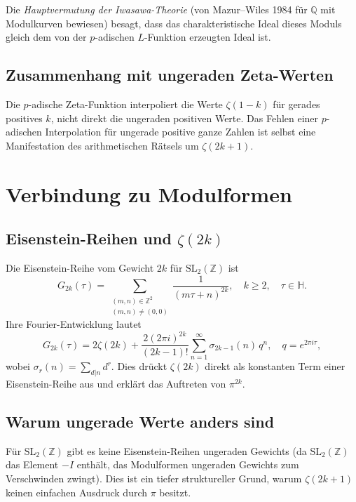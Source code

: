 \documentclass[12pt,a4paper]{amsart}
\theoremstyle{definition}
\theoremstyle{remark}
\begin{document}
Die \emph{Hauptvermutung der Iwasawa-Theorie} (von Mazur--Wiles 1984 für $\mathbb{Q}$
mit Modulkurven bewiesen) besagt, dass das charakteristische Ideal dieses Moduls
gleich dem von der $p$-adischen $L$-Funktion erzeugten Ideal ist.

\subsection{Zusammenhang mit ungeraden Zeta-Werten}

Die $p$-adische Zeta-Funktion interpoliert die Werte $\zeta(1-k)$ für gerades
positives $k$, nicht direkt die ungeraden positiven Werte. Das Fehlen einer
$p$-adischen Interpolation für ungerade positive ganze Zahlen ist selbst eine
Manifestation des arithmetischen Rätsels um $\zeta(2k+1)$.

\section{Verbindung zu Modulformen}

\subsection{Eisenstein-Reihen und $\zeta(2k)$}

Die Eisenstein-Reihe vom Gewicht $2k$ für $\mathrm{SL}_2(\mathbb{Z})$ ist
\[
  G_{2k}(\tau) = \sum_{\substack{(m,n) \in \mathbb{Z}^2 \\ (m,n) \neq (0,0)}}
  \frac{1}{(m\tau + n)^{2k}}, \quad k \geq 2, \quad \tau \in \mathbb{H}.
\]
Ihre Fourier-Entwicklung lautet
\[
  G_{2k}(\tau) = 2\zeta(2k) + \frac{2(2\pi i)^{2k}}{(2k-1)!}
  \sum_{n=1}^{\infty} \sigma_{2k-1}(n)\, q^n, \quad q = e^{2\pi i \tau},
\]
wobei $\sigma_r(n) = \sum_{d|n} d^r$. Dies drückt $\zeta(2k)$ direkt als
konstanten Term einer Eisenstein-Reihe aus und erklärt das Auftreten von $\pi^{2k}$.

\subsection{Warum ungerade Werte anders sind}

Für $\mathrm{SL}_2(\mathbb{Z})$ gibt es keine Eisenstein-Reihen ungeraden
Gewichts (da $\mathrm{SL}_2(\mathbb{Z})$ das Element $-I$ enthält, das Modulformen
ungeraden Gewichts zum Verschwinden zwingt). Dies ist ein tiefer struktureller
Grund, warum $\zeta(2k+1)$ keinen einfachen Ausdruck durch $\pi$ besitzt.
\end{document}

